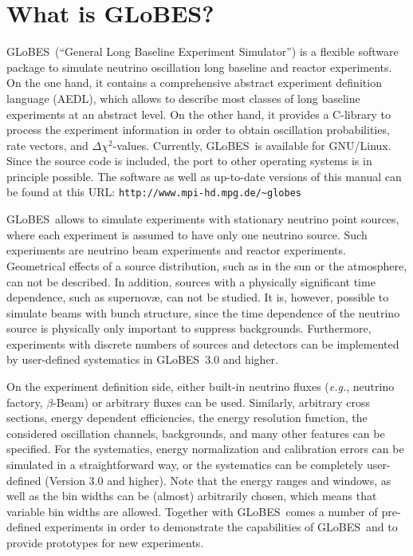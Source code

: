 \documentclass[a4paper,12pt,twoside]{book}
\newcommand{\eg}{{\it e.g.}}
\newcommand{\GLOBES}{{\sf GLoBES}}
\newcommand{\AEDL}{{\sf AEDL}}
\begin{document}
\cleardoublepage
\setcounter{page}{1}

\chapter*{What is \GLOBES ?}

\vspace*{-4ex}
\GLOBES\ (``General Long Baseline Experiment Simulator'') is a flexible
software package to simulate neutrino oscillation 
long baseline and reactor experiments. On the
one hand, it contains a comprehensive abstract experiment definition
language (\AEDL), which allows to describe most classes 
of long baseline experiments
at an abstract level. On the other hand, it provides a C-library to
process the experiment information in order to obtain oscillation
probabilities, rate vectors, and $\Delta \chi^2$-values. Currently, 
\GLOBES\ is available for GNU/Linux. Since the source code is included,
the port to other operating systems is in principle possible. The software
as well as up-to-date versions of this manual can be found at this URL:
 \verb+http://www.mpi-hd.mpg.de/~globes+

\GLOBES\ allows to simulate experiments with stationary neutrino point sources, where each experiment is assumed to have only one neutrino source.
Such experiments are neutrino beam experiments and reactor experiments. 
Geometrical effects of a source distribution, such as in the sun or the 
atmosphere, can not be described. In addition, sources with a physically 
significant time dependence, such as supernov\ae, can not be studied. It 
is, however, possible to simulate beams with bunch structure, since the 
time dependence of the neutrino source is physically only important to suppress backgrounds. 
Furthermore, experiments with discrete numbers of sources and detectors can
be implemented by user-defined systematics in \GLOBES\ 3.0 and higher.

On the experiment definition side, either built-in neutrino fluxes
(\eg, neutrino factory, $\beta$-Beam) or arbitrary fluxes can be used. Similarly,
arbitrary cross sections, energy dependent efficiencies, the
energy resolution function, the considered oscillation channels, 
backgrounds, and many other features can be specified. 
For the systematics, energy
normalization and calibration errors can be simulated in a straightforward way,
or the systematics can be completely user-defined (Version 3.0 and higher). Note that
the energy ranges and windows, as well as the bin widths can be
(almost) arbitrarily chosen, which means that variable bin
widths are allowed. Together with \GLOBES\ comes a number of
pre-defined experiments in order to demonstrate the capabilities
of \GLOBES\ and to provide prototypes for new experiments.
\end{document}
